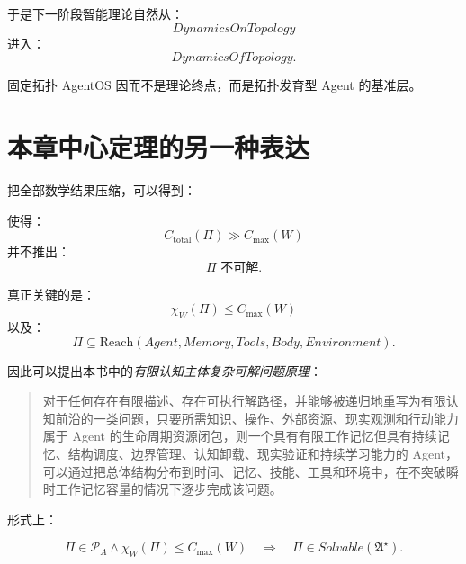 于是下一阶段智能理论自然从：
\begin{equation}
DynamicsOnTopology
\end{equation}
进入：
\begin{equation}
DynamicsOfTopology.
\end{equation}

固定拓扑 AgentOS 因而不是理论终点，而是拓扑发育型 Agent 的基准层。

\section{本章中心定理的另一种表达}

把全部数学结果压缩，可以得到：

\begin{statementbox}
\centering
{}
\end{statementbox}

使得：
\begin{equation}
\boxed{
C_{\mathrm{total}}(\Pi)
\gg
C_{\max}(W)
}
\end{equation}
并不推出：
\begin{equation}
\Pi
\text{ 不可解}.
\end{equation}

真正关键的是：
\begin{equation}
\boxed{
\chi_W(\Pi)
\leq
C_{\max}(W)
}
\end{equation}
以及：
\begin{equation}
\boxed{
\Pi
\subseteq
\mathrm{Reach}
(
Agent,
Memory,
Tools,
Body,
Environment
).
}
\end{equation}

因此可以提出本书中的\emph{有限认知主体复杂可解问题原理}：

\begin{quote}
对于任何存在有限描述、存在可执行解路径，并能够被递归地重写为有限认知前沿的一类问题，只要所需知识、操作、外部资源、现实观测和行动能力属于 Agent 的生命周期资源闭包，则一个具有有限工作记忆但具有持续记忆、结构调度、边界管理、认知卸载、现实验证和持续学习能力的 Agent，可以通过把总体结构分布到时间、记忆、技能、工具和环境中，在不突破瞬时工作记忆容量的情况下逐步完成该问题。
\end{quote}

形式上：

\begin{equation}
\boxed{
\Pi\in\mathscr P_A
\land
\chi_W(\Pi)\leq C_{\max}(W)
\quad
\Longrightarrow
\quad
\Pi\in Solvable(\mathfrak A^\star).
}
\end{equation}

